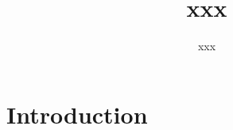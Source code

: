 \documentclass{llncs}
\begin{document}
\title{xxx}


\author{xxx}



\maketitle

\begin{abstract}

\begin{keywords}

\end{keywords}

\end{abstract}

\section{Introduction}



\end{document}
